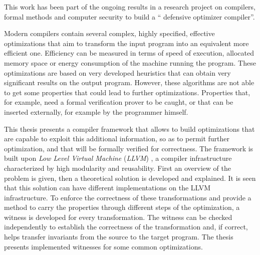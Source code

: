 
This work has been part of the ongoing results in a research project on compilers, formal methods and computer security to build a `` defensive optimizer compiler''.

Modern compilers contain several complex, highly specified, effective optimizations that aim to transform the input program into an equivalent more efficient one. Efficiency can be measured in terms of speed of execution, allocated memory space or energy consumption of the machine running the program. These optimizations are based on very developed heuristics that can obtain very significant results on the output program. However, these algorithms are not able to get some properties that could lead to further optimizations. Properties that, for example, need a formal verification prover to be caught, or that can be inserted externally, for example by the programmer himself.

This thesis presents a compiler framework that allows to build optimizations that are capable to exploit this additional information, so as to permit further optimization, and that will be formally verified for correctness. The framework is built upon \emph{Low Level Virtual Machine} (\emph{LLVM}) \cite{lattner2002llvm}, a compiler infrastructure characterized by high modularity and reusability. First an overview of the problem is given, then a theoretical solution is developed and explained. It is seen that this solution can have different implementations on the LLVM infrastructure. To enforce the correctness of these transformations and provide a method to carry the properties through different steps of the optimization, a witness is developed for every transformation. The witness can be checked independently to establish the correctness of the transformation and, if correct, helps transfer invariants from the source to the target program. The thesis presents implemented witnesses for some common optimizations.
